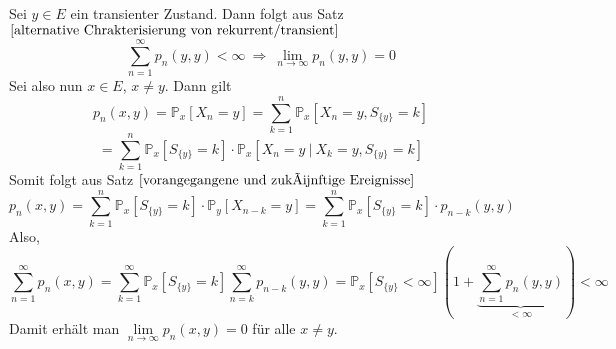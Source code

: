 Sei $y \in E$ ein transienter Zustand. Dann folgt aus Satz $\ref{alternative Chrakterisierung von rekurrent/transient}$
\begin{equation*}
\sum_{n=1}^{\infty} p_{n}(y,y) < \infty \: \Rightarrow \: \lim_{n \to \infty} p_{n}(y,y) = 0
\end{equation*}
Sei also nun $x \in E$, $x \neq y$. Dann gilt
\begin{equation*}
p_{n}(x,y) = \mathbb{P}_{x}[X_{n} = y] = \sum_{k=1}^{n} \mathbb{P}_{x}[X_{n} = y, S_{\lbrace y \rbrace} = k]
\end{equation*}
\begin{equation*}
= \sum_{k=1}^{n} \mathbb{P}_{x}[S_{\lbrace y \rbrace} = k] \cdot \mathbb{P}_{x}[X_{n} = y \: | \: X_{k} = y, S_{\lbrace y \rbrace} = k] 
\end{equation*}
Somit folgt aus Satz $\ref{vorangegangene und zukünftige Ereignisse}$
\begin{equation*}
p_{n}(x,y) = \sum_{k=1}^{n} \mathbb{P}_{x}[S_{\lbrace y \rbrace} = k] \cdot \mathbb{P}_{y}[X_{n-k} = y] = \sum_{k=1}^{n} \mathbb{P}_{x}[S_{\lbrace y \rbrace} = k] \cdot p_{n-k}(y,y)
\end{equation*}
Also,
\begin{equation*}
\sum_{n=1}^{\infty} p_{n}(x,y) = \sum_{k=1}^{\infty} \mathbb{P}_{x}[S_{\lbrace y \rbrace} = k] \sum_{n=k}^{\infty} p_{n-k}(y,y) = \mathbb{P}_{x}[S_{\lbrace y \rbrace} < \infty](1 + \underbrace{\sum_{n=1}^{\infty} p_{n}(y,y)}_{< \infty}) < \infty
\end{equation*}
Damit erhält man $\lim \limits_{n \to \infty} p_{n}(x,y) = 0$ für alle $x \neq y$.